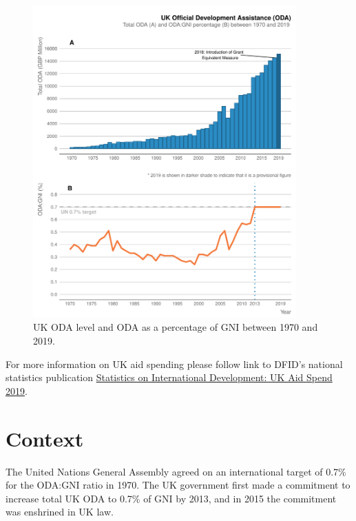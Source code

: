 \begin{figure}[htbp]
  \centering
\begin{knitrout}
\color{fgcolor}
\includegraphics[width=0.9\textwidth]{figs/oda_gni_plot-1} 

\end{knitrout}
  \caption{UK ODA level and ODA as a percentage of GNI between 1970 and 2019.}
  \label{fig:oda_gni_plot}
\end{figure}

For more information on UK aid spending please follow link to DFID's national statistics publication \href{https://www.gov.uk/government/statistics/statistics-on-international-development-provisional-uk-aid-spend-2019}{Statistics on International Development: UK Aid Spend 2019}. %

\section{Context}

The United Nations General Assembly agreed on an international target of 0.7\% for the ODA:GNI ratio in 1970. %
The UK government first made a commitment to increase total UK ODA to 0.7\% of GNI by 2013, and in 2015 the commitment was enshrined in UK law. %

\newpage

